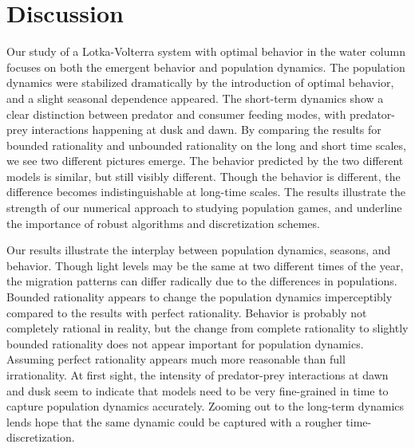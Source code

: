 \section{Discussion}

Our study of a Lotka-Volterra system with optimal behavior in the water column focuses on both the emergent behavior and population dynamics. The population dynamics were stabilized dramatically by the introduction of optimal behavior, and a slight seasonal dependence appeared. The short-term dynamics show a clear distinction between predator and consumer feeding modes, with predator-prey interactions happening at dusk and dawn. By comparing the results for bounded rationality and unbounded rationality on the long and short time scales, we see two different pictures emerge. The behavior predicted by the two different models is similar, but still visibly different. Though the behavior is different, the difference becomes indistinguishable at long-time scales. The results illustrate the strength of our numerical approach to studying population games, and underline the importance of robust algorithms and discretization schemes.


Our results illustrate the interplay between population dynamics, seasons, and behavior. Though light levels may be the same at two different times of the year, the migration patterns can differ radically due to the differences in populations. Bounded rationality appears to change the population dynamics imperceptibly compared to the results with perfect rationality. Behavior is probably not completely rational in reality, but the change from complete rationality to slightly  bounded rationality does not appear important for population dynamics. Assuming perfect rationality appears much more reasonable than full irrationality. At first sight, the intensity of predator-prey interactions at dawn and dusk seem to indicate that models need to be very fine-grained in time to capture population dynamics accurately. Zooming out to the long-term dynamics lends hope that the same dynamic could be captured with a rougher time-discretization.

